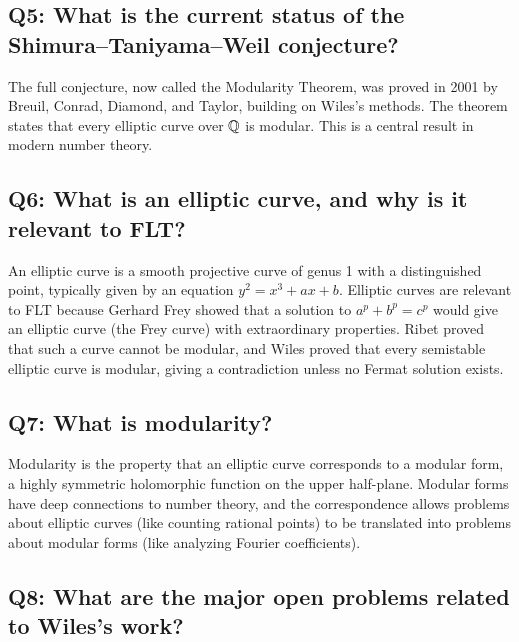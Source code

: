 \subsection*{Q5: What is the current status of the Shimura--Taniyama--Weil conjecture?}

The full conjecture, now called the Modularity Theorem, was proved in 2001 by Breuil, Conrad, Diamond, and Taylor, building on Wiles's methods. The theorem states that every elliptic curve over \(\mathbb{Q}\) is modular. This is a central result in modern number theory.

\subsection*{Q6: What is an elliptic curve, and why is it relevant to FLT?}

An elliptic curve is a smooth projective curve of genus 1 with a distinguished point, typically given by an equation \(y^2 = x^3 + ax + b\). Elliptic curves are relevant to FLT because Gerhard Frey showed that a solution to \(a^p + b^p = c^p\) would give an elliptic curve (the Frey curve) with extraordinary properties. Ribet proved that such a curve cannot be modular, and Wiles proved that every semistable elliptic curve is modular, giving a contradiction unless no Fermat solution exists.

\subsection*{Q7: What is modularity?}

Modularity is the property that an elliptic curve corresponds to a modular form, a highly symmetric holomorphic function on the upper half-plane. Modular forms have deep connections to number theory, and the correspondence allows problems about elliptic curves (like counting rational points) to be translated into problems about modular forms (like analyzing Fourier coefficients).

\subsection*{Q8: What are the major open problems related to Wiles's work?}

